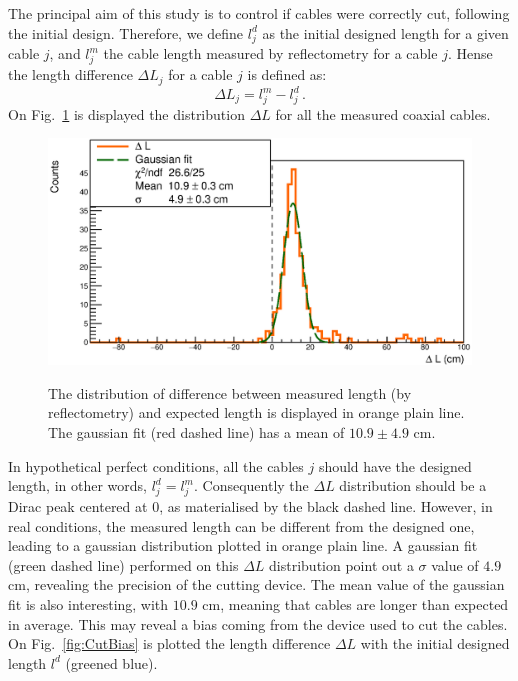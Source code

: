 The principal aim of this study is to control if cables were correctly cut, following the initial design.
Therefore, we define $l^{d}_{j}$ as the initial designed length for a given cable $j$, and $l^{m}_{j}$ the cable length measured by reflectometry for a cable $j$.
Hense the length difference $\Delta L_{j}$ for a cable $j$ is defined as:
\begin{equation}
  \Delta L_{j} = l^{m}_{j}-l^{d}_{j}\, .
\end{equation}
On Fig.~\ref{fig:LengthDiff} is displayed the distribution $\Delta L$ for all the measured coaxial cables.
\begin{figure}
  \centering
  \includegraphics[width=15cm]{commissioning/fig_commissioning/length_diff.eps}
  \label{fig:LengthDiff}
  \caption{The distribution of difference between measured length (by reflectometry) and expected length is displayed in orange plain line.
  The gaussian fit (red dashed line) has a mean of $10.9 \pm 4.9$ cm.}
\end{figure}
In hypothetical perfect conditions, all the cables $j$ should have the designed length, in other words, $l^{d}_{j} = l^{m}_{j}$.
Consequently the $\Delta L$ distribution should be a Dirac peak centered at $0$, as materialised by the black dashed line.
However, in real conditions, the measured length can be different from the designed one, leading to a gaussian distribution plotted in orange plain line.
A gaussian fit (green dashed line) performed on this $\Delta L$ distribution point out a $\sigma$ value of $4.9$ cm, revealing the precision of the cutting device.
The mean value of the gaussian fit is also interesting, with $10.9$ cm, meaning that cables are longer than expected in average.
This may reveal a bias coming from the device used to cut the cables.
On Fig.~\ref{fig:CutBias} is plotted the length difference $\Delta L$ with the initial designed length $l^{d}$ (greened blue).
